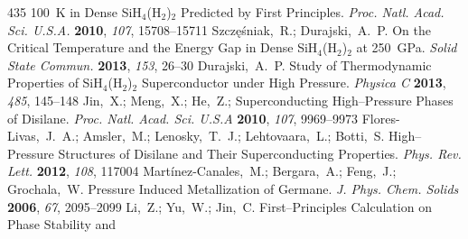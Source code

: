\documentclass[12pt,letterpaper,oneside]{article}
\begin{document}
\begin{mcitethebibliography}{435}
  100~K in Dense SiH$_4$(H$_2$)$_2$ Predicted by First Principles. \emph{Proc.
  Natl. Acad. Sci. U.S.A.} \textbf{2010}, \emph{107}, 15708--15711\relax
\mciteBstWouldAddEndPuncttrue
\mciteSetBstMidEndSepPunct{\mcitedefaultmidpunct}
{\mcitedefaultendpunct}{\mcitedefaultseppunct}\relax
\EndOfBibitem
{}
Szcz{\k e}{\'s}niak,~R.; Durajski,~A.~P. On the Critical Temperature and the
  Energy Gap in Dense SiH$_4$(H$_2$)$_2$ at 250~GPa. \emph{Solid State Commun.}
  \textbf{2013}, \emph{153}, 26--30\relax
\mciteBstWouldAddEndPuncttrue
\mciteSetBstMidEndSepPunct{\mcitedefaultmidpunct}
{\mcitedefaultendpunct}{\mcitedefaultseppunct}\relax
\EndOfBibitem
{}
Durajski,~A.~P. Study of Thermodynamic Properties of SiH$_4$(H$_2$)$_2$
  Superconductor under High Pressure. \emph{Physica C} \textbf{2013},
  \emph{485}, 145--148\relax
\mciteBstWouldAddEndPuncttrue
\mciteSetBstMidEndSepPunct{\mcitedefaultmidpunct}
{\mcitedefaultendpunct}{\mcitedefaultseppunct}\relax
\EndOfBibitem
{}
Jin,~X.; Meng,~X.; He,~Z.;   Superconducting
  High--Pressure Phases of Disilane. \emph{Proc. Natl. Acad. Sci. U.S.A}
  \textbf{2010}, \emph{107}, 9969--9973\relax
\mciteBstWouldAddEndPuncttrue
\mciteSetBstMidEndSepPunct{\mcitedefaultmidpunct}
{\mcitedefaultendpunct}{\mcitedefaultseppunct}\relax
\EndOfBibitem
{}
Flores-Livas,~J.~A.; Amsler,~M.; Lenosky,~T.~J.; Lehtovaara,~L.; Botti,~S.
    High--Pressure Structures of Disilane and Their
  Superconducting Properties. \emph{Phys. Rev. Lett.} \textbf{2012},
  \emph{108}, 117004\relax
\mciteBstWouldAddEndPuncttrue
\mciteSetBstMidEndSepPunct{\mcitedefaultmidpunct}
{\mcitedefaultendpunct}{\mcitedefaultseppunct}\relax
\EndOfBibitem
{}
Mart{\'i}nez-Canales,~M.; Bergara,~A.; Feng,~J.; Grochala,~W. Pressure Induced
  Metallization of Germane. \emph{J. Phys. Chem. Solids} \textbf{2006},
  \emph{67}, 2095--2099\relax
\mciteBstWouldAddEndPuncttrue
\mciteSetBstMidEndSepPunct{\mcitedefaultmidpunct}
{\mcitedefaultendpunct}{\mcitedefaultseppunct}\relax
\EndOfBibitem
{}
Li,~Z.; Yu,~W.; Jin,~C. First--Principles Calculation on Phase Stability and

\end{mcitethebibliography}
\end{document}

